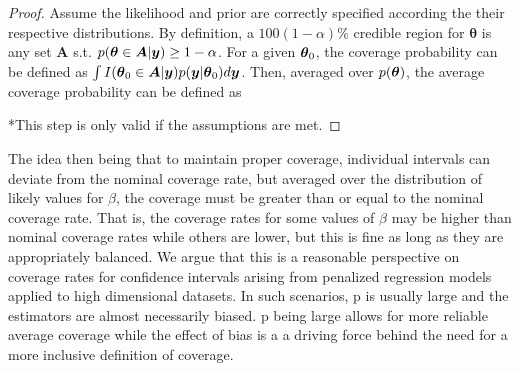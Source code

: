 \begin{proof}
Assume the likelihood and prior are correctly specified according the their respective distributions. By definition, a $100(1-\alpha)\%$ credible region for $\boldsymbol{\theta}$ is any set $\boldsymbol{A}$ s.t. $p(\boldsymbol{\theta} \in \boldsymbol{A} | \boldsymbol{y}) \geq 1 - \alpha$. For a given $\boldsymbol{\theta}_0$, the coverage probability can be defined as $\int I(\boldsymbol{\theta}_0 \in \boldsymbol{A} | \boldsymbol{y}) p(\boldsymbol{y} | \boldsymbol{\theta}_0)d\boldsymbol{y}$. Then, averaged over $p(\boldsymbol{\theta})$, the average coverage probability can be defined as


*This step is only valid if the assumptions are met.
\end{proof}
The idea then being that to maintain proper coverage, individual intervals can deviate from the nominal coverage rate, but averaged over the distribution of likely values for $\beta$, the coverage must be greater than or equal to the nominal coverage rate. That is, the coverage rates for some values of $\beta$ may be higher than nominal coverage rates while others are lower, but this is fine as long as they are appropriately balanced. We argue that this is a reasonable perspective on coverage rates for confidence intervals arising from penalized regression models applied to high dimensional datasets. In such scenarios, p is usually large and the estimators are almost necessarily biased. p being large allows for more reliable average coverage while the effect of bias is a a driving force behind the need for a more inclusive definition of coverage.

